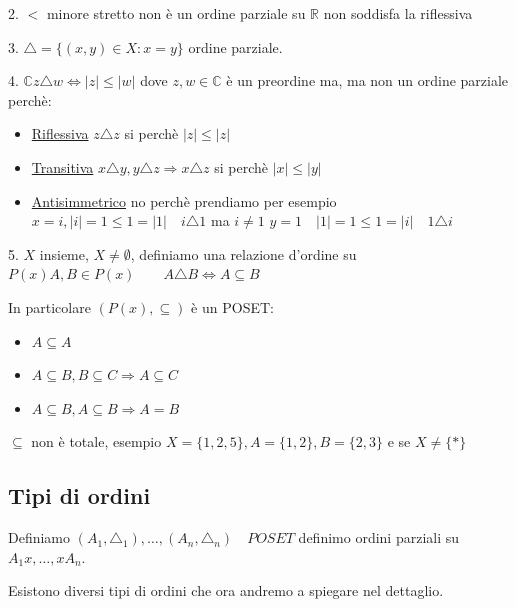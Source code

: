 \documentclass{article}
\begin{document}
2. $ < $ minore stretto non è un ordine parziale su $ \mathbb{R} $ non soddisfa la riflessiva \newline

3. $ \triangle = \{(x,y) \in X : x = y\}$ ordine parziale. \newline 

4. $ \mathbb{C} z \triangle w \Leftrightarrow |z| \le |w| $ dove $ z,w \in \mathbb{C} $  è un preordine ma, ma non un ordine parziale perchè:
\begin{itemize}
        \item \underline{Riflessiva} $ z \triangle z$ si perchè $ |z| \le |z| $
        \item \underline{Transitiva} $ x \triangle y, y \triangle z \Rightarrow x \triangle z$  si perchè $ |x| \le |y| $
        \item \underline{Antisimmetrico} no perchè prendiamo per esempio \newline $ x = i, |i| = 1 \le 1 = |1| \quad i \triangle 1 $ ma $ i \not = 1 $  \newline $ y = 1 \quad |1| = 1 \le 1 = |i| \quad 1 \triangle i $    
\end{itemize}

5. $ X $ insieme, $ X \not = \emptyset $, definiamo una relazione d'ordine su $ P(x)  A,B \in P(x) \quad \quad A \triangle B \Leftrightarrow A \subseteq B $ \par
In particolare $ (P(x), \subseteq )$ è un POSET:\newline
\begin{itemize}
        \item $ A \subseteq A $
        \item $ A \subseteq B, B \subseteq C \Rightarrow A \subseteq C $
        \item $ A \subseteq B, A \subseteq B \Rightarrow A = B $
\end{itemize}
$ \subseteq $ non è totale, esempio $ X = \{1,2,5\}, A = \{1,2\}, B = \{2,3\} $ e se $ X \not = \{*\} $



\subsection{Tipi di ordini}
Definiamo $(A_1, \triangle_1), \ldots, (A_n, \triangle_n) \quad POSET$ definimo ordini parziali su $A_1x, \ldots, xA_n$. \par
Esistono diversi tipi di ordini che ora andremo a spiegare nel dettaglio.
\end{document}
